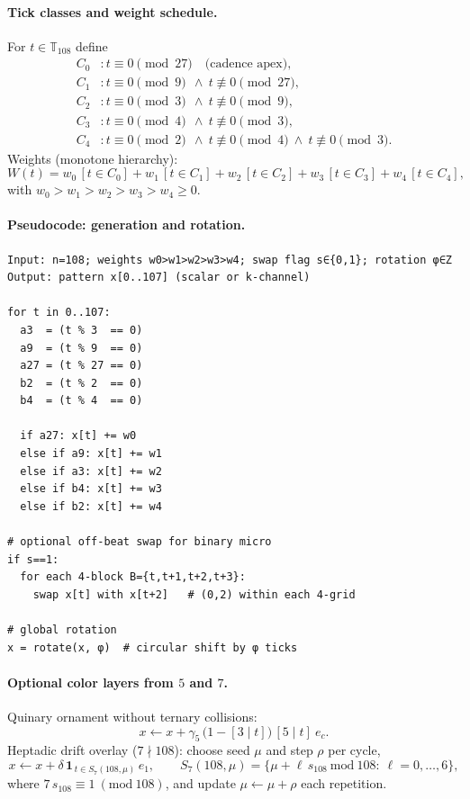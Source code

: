 \documentclass[12pt]{article}
\numberwithin{equation}{section}
\theoremstyle{plain}
\theoremstyle{definition}
\theoremstyle{remark}
\begin{document}
\paragraph{Tick classes and weight schedule.}
For $t\in\mathbb{T}_{108}$ define
\[
\begin{aligned}
C_0 &: t\equiv 0\pmod{27} \quad \text{(cadence apex)},\\
C_1 &: t\equiv 0\pmod{9}\ \ \wedge\ t\not\equiv 0\pmod{27},\\
C_2 &: t\equiv 0\pmod{3}\ \ \wedge\ t\not\equiv 0\pmod{9},\\
C_3 &: t\equiv 0\pmod{4}\ \ \wedge\ t\not\equiv 0\pmod{3},\\
C_4 &: t\equiv 0\pmod{2}\ \ \wedge\ t\not\equiv 0\pmod{4}\ \wedge\ t\not\equiv 0\pmod{3}.
\end{aligned}
\]
Weights (monotone hierarchy):
\[
W(t)=w_0\,[t\in C_0]+w_1\,[t\in C_1]+w_2\,[t\in C_2]+w_3\,[t\in C_3]+w_4\,[t\in C_4],
\]
with $w_0>w_1>w_2>w_3>w_4\ge 0$.

\paragraph{Pseudocode: generation and rotation.}
\begin{verbatim}
Input: n=108; weights w0>w1>w2>w3>w4; swap flag s∈{0,1}; rotation φ∈Z
Output: pattern x[0..107] (scalar or k-channel)

for t in 0..107:
  a3  = (t % 3  == 0)
  a9  = (t % 9  == 0)
  a27 = (t % 27 == 0)
  b2  = (t % 2  == 0)
  b4  = (t % 4  == 0)

  if a27: x[t] += w0
  else if a9: x[t] += w1
  else if a3: x[t] += w2
  else if b4: x[t] += w3
  else if b2: x[t] += w4

# optional off-beat swap for binary micro
if s==1:
  for each 4-block B={t,t+1,t+2,t+3}:
    swap x[t] with x[t+2]   # (0,2) within each 4-grid

# global rotation
x = rotate(x, φ)  # circular shift by φ ticks
\end{verbatim}

\paragraph{Optional color layers from $5$ and $7$.}
Quinary ornament without ternary collisions:
\[
x \leftarrow x + \gamma_5\,\big(1-[3\mid t]\big)\,[5\mid t]\ e_c.
\]
Heptadic drift overlay ($7\nmid 108$): choose seed $\mu$ and step $\rho$ per cycle,
\[
x \leftarrow x + \delta\,\mathbf{1}_{\,t\in S_7(108,\mu)}\,e_1,\qquad
S_7(108,\mu)=\{\mu+\ell\,s_{108}\ \mathrm{mod}\ 108:\ \ell=0,\dots,6\},
\]
where $7\,s_{108}\equiv 1\ (\mathrm{mod}\ 108)$, and update $\mu\leftarrow \mu+\rho$ each repetition.
\end{document}
